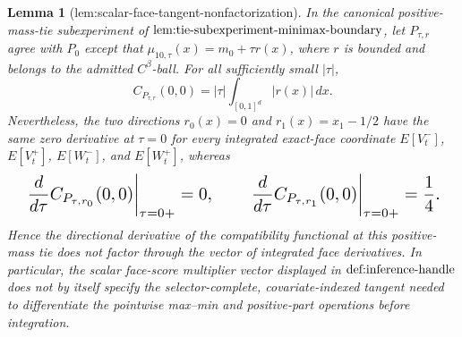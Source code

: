 \documentclass{article}
\newtheorem{lemma}{Lemma}
\begin{document}
\begin{lemma}[lem:scalar-face-tangent-nonfactorization]\label{lem:scalar-face-tangent-nonfactorization}
In the canonical positive-mass-tie subexperiment of \(\textup{lem:tie-subexperiment-minimax-boundary}\), let \(P_{\tau,r}\) agree with \(P_0\) except that \(\mu_{10,\tau}(x)=m_0+\tau r(x)\), where \(r\) is bounded and belongs to the admitted \(C^\beta\)-ball. For all sufficiently small \(|\tau|\), \[C_{P_{\tau,r}}(0,0)=|\tau|\int_{[0,1]^d}|r(x)|\,dx.\] Nevertheless, the two directions \(r_0(x)=0\) and \(r_1(x)=x_1-1/2\) have the same zero derivative at \(\tau=0\) for every integrated exact-face coordinate \(E[V_t^-]\), \(E[V_t^+]\), \(E[W_t^-]\), and \(E[W_t^+]\), whereas \[
\makebox[\linewidth][c]{\resizebox{0.98\linewidth}{!}{\par\noindent \makebox[\linewidth][c]{\resizebox{0.98\linewidth}{!}{\(\displaystyle \displaystyle \left.\frac{d}{d\tau}C_{P_{\tau,r_0}}(0,0)\right|_{\tau=0+}=0,\qquad \left.\frac{d}{d\tau}C_{P_{\tau,r_1}}(0,0)\right|_{\tau=0+}=\frac14.\)}}\par\noindent}}
\] Hence the directional derivative of the compatibility functional at this positive-mass tie does not factor through the vector of integrated face derivatives. In particular, the scalar face-score multiplier vector displayed in \(\textup{def:inference-handle}\) does not by itself specify the selector-complete, covariate-indexed tangent needed to differentiate the pointwise max--min and positive-part operations before integration.
\end{lemma}
\end{document}
